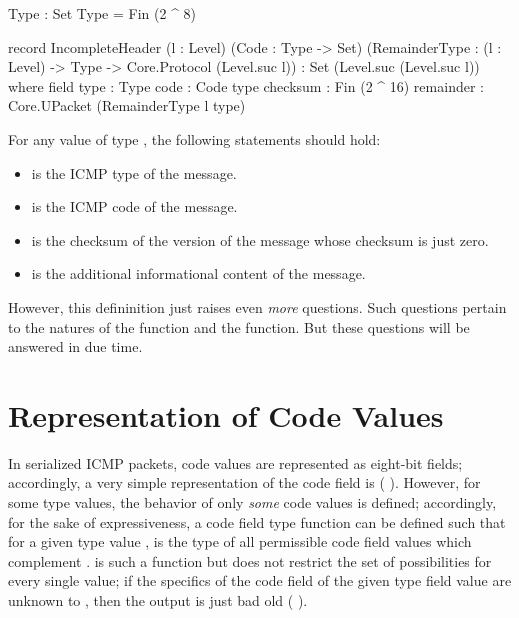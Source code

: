 \documentclass{report}
\begin{document}
\begin{itemize}
\begin{code}
  Type : Set
  Type = Fin (2 ^ 8)

  record IncompleteHeader (l : Level)
                          (Code : Type -> Set)
                          (RemainderType : (l : Level) ->
                                           Type ->
                                           Core.Protocol (Level.suc l)) :
                          Set (Level.suc (Level.suc l)) where
    field
      type : Type
      code : Code type
      checksum : Fin (2 ^ 16)
      remainder : Core.UPacket (RemainderType l type)
\end{code}

For any value  of type    , the following statements should hold:

\begin{itemize}
\item {}  is the ICMP type of the  message.
\item {}  is the ICMP code of the  message.
\item {}  is the checksum of the version of the  message whose checksum is just zero.
\item {}  is the additional informational content of the  message.
\end{itemize}

However, this defininition just raises even \emph{more} questions.  Such questions pertain to the natures of the  function and the  function.  But these questions will be answered in due time.

\section{Representation of Code Values}
In serialized ICMP packets, code values are represented as eight-bit fields; accordingly, a very simple representation of the code field is  \AgdaSymbol( \AgdaOperator{\AgdaFunction{\textasciicircum{}}} \AgdaSymbol).  However, for some type values, the behavior of only \emph{some} code values is defined; accordingly, for the sake of expressiveness, a code field type function  can be defined such that for a given type value ,   is the type of all permissible code field values which complement .   is such a function but does not restrict the set of possibilities for every single  value; if the specifics of the code field of the given type field value are unknown to , then the output is just bad old  \AgdaSymbol( \AgdaOperator{\AgdaFunction{\textasciicircum{}}} \AgdaSymbol).


\end{itemize}
\end{document}
